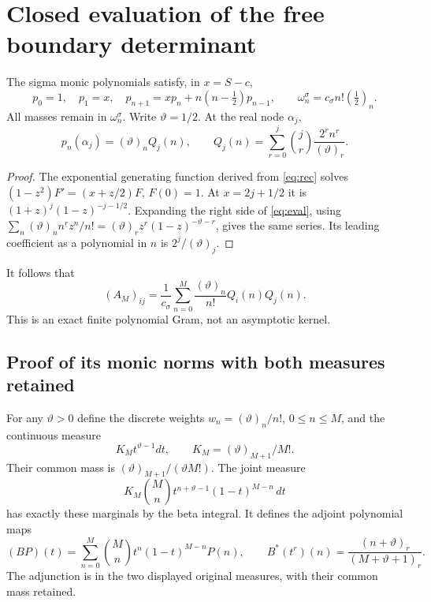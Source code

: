 \documentclass[11pt,a4paper]{article}
\begin{document}
\section{Closed evaluation of the free boundary determinant}\label{sec:closed}
The sigma monic polynomials satisfy, in $x=S-c$,
\begin{equation}
 p_0=1,\quad p_1=x,\quad
 p_{n+1}=xp_n+n(n-\tfrac12)p_{n-1},\qquad
 \omega_n^\sigma=c_\sigma n!(\tfrac12)_n.
 \label{eq:rec}
\end{equation}
All masses remain in $\omega_n^\sigma$. Write $\vartheta=1/2$. At the real node $\alpha_j$,
\begin{equation}
 p_n(\alpha_j)=(\vartheta)_n Q_j(n),\qquad
 Q_j(n)=\sum_{r=0}^j\binom jr\frac{2^r n^{\underline r}}{(\vartheta)_r}.
 \label{eq:eval}
\end{equation}
\begin{proof}
The exponential generating function derived from \eqref{eq:rec} solves
$(1-z^2)F'=(x+z/2)F$, $F(0)=1$. At $x=2j+1/2$ it is
$(1+z)^j(1-z)^{-j-1/2}$. Expanding the right side of \eqref{eq:eval}, using
$\sum_n(\vartheta)_n n^{\underline r}z^n/n!=(\vartheta)_r z^r(1-z)^{-\vartheta-r}$, gives the same series. Its leading coefficient as a polynomial in $n$ is $2^j/(\vartheta)_j$.
\end{proof}
It follows that
\begin{equation}
 (A_M)_{ij}=\frac1{c_\sigma}\sum_{n=0}^M
 \frac{(\vartheta)_n}{n!}Q_i(n)Q_j(n).
 \label{eq:discrete}
\end{equation}
This is an exact finite polynomial Gram, not an asymptotic kernel.

\subsection{Proof of its monic norms with both measures retained}
For any $\vartheta>0$ define the discrete weights $w_n=(\vartheta)_n/n!$, $0\le n\le M$, and the continuous measure
\begin{equation}
 K_Mt^{\vartheta-1}dt,\qquad K_M=(\vartheta)_{M+1}/M!.
\end{equation}
Their common mass is $(\vartheta)_{M+1}/(\vartheta M!)$. The joint measure
\begin{equation}
 K_M\binom Mn t^{n+\vartheta-1}(1-t)^{M-n}\,dt
\end{equation}
has exactly these marginals by the beta integral. It defines the adjoint polynomial maps
\begin{equation}
 (BP)(t)=\sum_{n=0}^M\binom Mn t^n(1-t)^{M-n}P(n),\qquad
 B^*(t^r)(n)=\frac{(n+\vartheta)_r}{(M+\vartheta+1)_r}.
\end{equation}
The adjunction is in the two displayed original measures, with their common mass retained.
\end{document}
